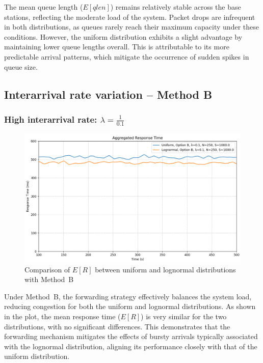 \documentclass{report}
\begin{document}
\begin{flushleft}
The mean queue length ($E[qlen]$) remains relatively stable across the base stations, reflecting the moderate load of the system. Packet drops are infrequent in both distributions, as queues rarely reach their maximum capacity under these conditions. However, the uniform distribution exhibits a slight advantage by maintaining lower queue lengths overall. This is attributable to its more predictable arrival patterns, which mitigate the occurrence of sudden spikes in queue size.
\end{flushleft}


\subsection{Interarrival rate variation -- Method B}
\subsubsection*{High interarrival rate: $\lambda = \frac{1}{0.1}$}
\begin{figure}[H]
    \centering
    \includegraphics[width=\textwidth]{img/plots/I-vary/R_B_I01.png}
    \caption{Comparison of $E[R]$ between uniform and lognormal distributions with Method~B}
\end{figure}

Under Method~B, the forwarding strategy effectively balances the system load, reducing congestion for both the uniform and lognormal distributions.
As shown in the plot, the mean response time ($E[R]$) is very similar for the two distributions, with no significant differences.
This demonstrates that the forwarding mechanism mitigates the effects of bursty arrivals typically associated with the lognormal distribution, aligning its performance closely with that of the uniform distribution.
\end{document}
